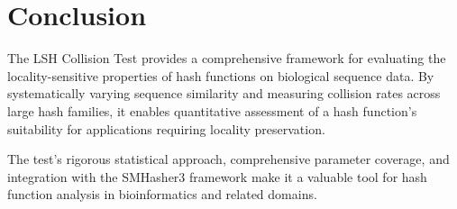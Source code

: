 \documentclass[11pt,a4paper]{article}
\begin{document}
\section{Conclusion}

The LSH Collision Test provides a comprehensive framework for evaluating the locality-sensitive properties of hash functions on biological sequence data. By systematically varying sequence similarity and measuring collision rates across large hash families, it enables quantitative assessment of a hash function's suitability for applications requiring locality preservation.

The test's rigorous statistical approach, comprehensive parameter coverage, and integration with the SMHasher3 framework make it a valuable tool for hash function analysis in bioinformatics and related domains.
\end{document}

